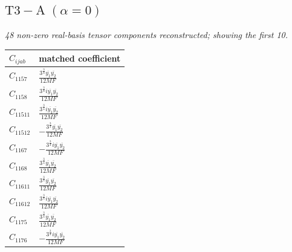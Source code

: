 \documentclass[9pt]{article}
\begin{document}
\subsection*{$ \mathrm{T3-A}\;(\alpha=0) $}
\textit{48 non-zero real-basis tensor components reconstructed; showing the first 10.}
\begin{longtable}{@{}ll@{}}
\toprule
$C_{ijab}$ & matched coefficient \\
\midrule
$C_{1157}$ & $ \frac{3^{\frac{3}{4}} \overline{y_{1}} \overline{y_{2}}}{12 MF} $ \\
$C_{1158}$ & $ \frac{3^{\frac{3}{4}} i \overline{y_{1}} \overline{y_{2}}}{12 MF} $ \\
$C_{11511}$ & $ \frac{3^{\frac{3}{4}} i \overline{y_{1}} \overline{y_{2}}}{12 MF} $ \\
$C_{11512}$ & $ - \frac{3^{\frac{3}{4}} \overline{y_{1}} \overline{y_{2}}}{12 MF} $ \\
$C_{1167}$ & $ - \frac{3^{\frac{3}{4}} i \overline{y_{1}} \overline{y_{2}}}{12 MF} $ \\
$C_{1168}$ & $ \frac{3^{\frac{3}{4}} \overline{y_{1}} \overline{y_{2}}}{12 MF} $ \\
$C_{11611}$ & $ \frac{3^{\frac{3}{4}} \overline{y_{1}} \overline{y_{2}}}{12 MF} $ \\
$C_{11612}$ & $ \frac{3^{\frac{3}{4}} i \overline{y_{1}} \overline{y_{2}}}{12 MF} $ \\
$C_{1175}$ & $ \frac{3^{\frac{3}{4}} \overline{y_{1}} \overline{y_{2}}}{12 MF} $ \\
$C_{1176}$ & $ - \frac{3^{\frac{3}{4}} i \overline{y_{1}} \overline{y_{2}}}{12 MF} $ \\
\bottomrule
\end{longtable}
\end{document}
